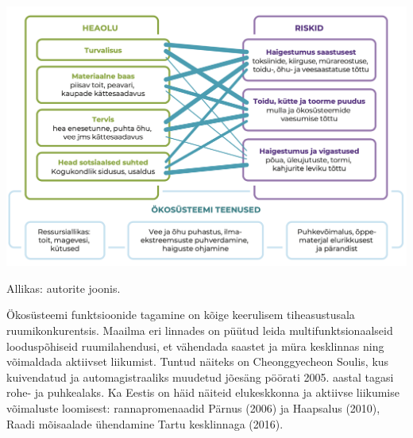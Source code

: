 \documentclass[estonian,]{article}
\begin{document}
\begin{center}\includegraphics[width=0.9\linewidth]{figures/3-chapter/fig322} \end{center}

\begin{imgsource}
{Allikas:} autorite joonis.
\end{imgsource}

Ökosüsteemi funktsioonide tagamine on kõige keerulisem tiheasustusala ruumikonkurentsis. Maailma eri linnades on püütud leida multifunktsionaalseid looduspõhiseid ruumilahendusi, et vähendada saastet ja müra kesklinnas ning võimaldada aktiivset liikumist. Tuntud näiteks on Cheonggyecheon Soulis, kus kuivendatud ja automagistraaliks muudetud jõesäng pöörati 2005. aastal tagasi rohe- ja puhkealaks. Ka Eestis on häid näiteid elukeskkonna ja aktiivse liikumise võimaluste loomisest: rannapromenaadid Pärnus (2006) ja Haapsalus (2010), Raadi mõisaalade ühendamine Tartu kesklinnaga (2016).
\end{document}
